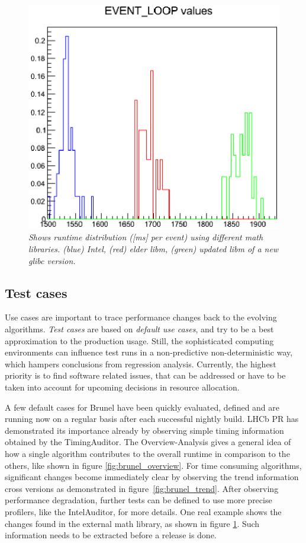 \documentclass[a4paper]{jpconf}
\begin{document}
\begin{figure}[t]
\begin{minipage}[t]{0.29\textwidth}
\includegraphics[scale=0.40]{figures/brunel_basic_libm.eps}
\caption{\small \textit{Shows runtime distribution ([ms] per event) using different math libraries. (blue) Intel, (red) elder libm, (green) updated libm of a new glibc version.}}
\label{fig:brunel_basic_libm}
\end{minipage}
\end{figure}

\subsection{Test cases}
\label{sec:test_cases}

Use cases are important to trace performance changes back to the evolving algorithms. \textit{Test cases} are based on \textit{default use cases}, and try to be a best approximation to the production usage. Still, the sophisticated computing environments can influence test runs in a non-predictive non-deterministic way, which hampers conclusions from regression analysis. Currently, the highest priority is to find software related issues, that can be addressed or have to be taken into account for upcoming decisions in resource allocation.

A few default cases for Brunel have been quickly evaluated, defined and are running now on a regular basis after each successful nightly build. LHCb PR has demonstrated its importance already by observing simple timing information obtained by the TimingAuditor. The Overview-Analysis gives a general idea of how a single algorithm contributes to the overall runtime in comparison to the others, like shown in figure \ref{fig:brunel_overview}. For time consuming algorithms, significant changes become immediately clear by observing the trend information cross versions as demonstrated in \mbox{figure \ref{fig:brunel_trend}}. After observing performance degradation, further tests can be defined to use more precise profilers, like the IntelAuditor, for more details. One real example shows the changes found in the external math library, as shown in figure \ref{fig:brunel_basic_libm}. Such information needs to be extracted before a release is done.
\end{document}
